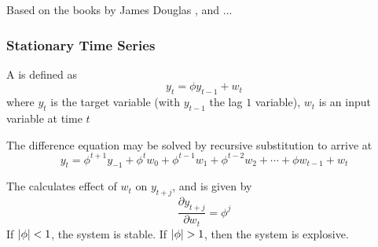 Based on the books by James Douglas \cite{hamilton_1994}, and ...

\subsubsection{Stationary Time Series}

\begin{definition}
A  is defined as
\begin{equation}
y_t = \phi y_{t-1} + w_t \nonumber
\end{equation}
where $y_t$ is the target variable (with $y_{t-1}$ the lag $1$ variable), $w_t$ is an input variable at time $t$
\end{definition}


The difference equation may be solved by recursive substitution to arrive at
\begin{equation}
y_t = \phi^{t+1}y_{-1} + \phi^{t} w_0 + \phi^{t-1} w_1 + \phi^{t-2} w_2 + \cdots + \phi w_{t-1} + w_t \nonumber
\end{equation}

The  calculates effect of $w_t$ on $y_{t+j}$, and is given by
\begin{equation}
\frac{\partial y_{t+j}}{\partial w_t} = \phi^j \nonumber
\end{equation}
If $\left\lvert\phi\right\rvert < 1$, the system is stable. If $\left\lvert\phi\right\rvert > 1$, then the system is explosive.

